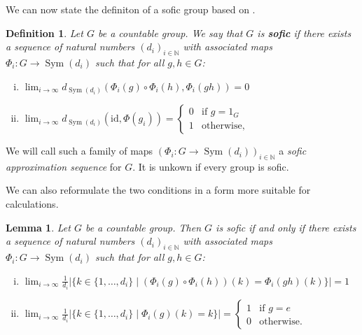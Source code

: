 \documentclass[titlepage, a4paper]{article}
\newcommand{\N}{\mathbb{N}}
\newcommand{\card}[1]{\left| #1 \right|}
\newcommand{\id}{\mathrm{id}}
\DeclareMathOperator{\sym}{Sym}
\newtheorem{definition}[theorem]{Definition}
\newtheorem{lemma}[theorem]{Lemma}
\theoremstyle{remark}
\begin{document}
We can now state the definiton of a sofic group based on \cite[section 1]{kerr_li_2010}.

\begin{definition}{}\label{def:Sofic}
        Let $G$ be a countable group. We say that $G$ is \textbf{sofic} if there exists a sequence of natural numbers $(d_i)_{i \in \N}$ with associated maps $\Phi_i : G \to \sym(d_i)$ such that for all $g, h \in G$:
        \begin{enumerate}[(i)]
            \item $ \displaystyle \lim_{i \to \infty} d_{\sym(d_i)}(\Phi_i(g) \circ \Phi_i(h), \Phi_i(gh)) = 0$
            \item $ \displaystyle \lim_{i \to \infty} d_{\sym(d_i)}(\id,\Phi(g_i)) = \begin{cases}  0 & \text{if } g = 1_G \\
                                                                                    1 & \text{otherwise,}
                                                                                    \end{cases}$
        \end{enumerate}
    \end{definition}

    We will call such a family of maps $\left(\Phi_i : G \to \sym(d_i) \right)_{i \in \N}$ 
    a \emph{sofic approximation sequence} for $G$. It is unkown if every group is sofic.

    We can also reformulate the two conditions in a form more suitable for calculations.
     \begin{lemma}
        Let $G$ be a countable group. Then $G$ is sofic if and only if there exists a sequence of natural numbers $(d_i)_{i \in \N}$ with associated maps $\Phi_i : G \to \sym(d_i)$ such that for all $g, h \in G$:
        \begin{enumerate}[(i)]
            \item $\displaystyle \lim_{i\to \infty} \frac{1}{d_i} \card{\big\{k \in \{1, \dots, d_i\} \mid (\Phi_i(g) \circ \Phi_i(h))(k) = \Phi_i(gh) (k) \big\}} = 1$
            \item $\displaystyle \lim_{i\to \infty} \frac{1}{d_i}  \card{\big\{k \in \{1, \dots, d_i\} \mid \Phi_i(g)(k) = k \big\}} = \begin{cases}  1 & \text{if } g = e \\
                                                                                    0 & \text{otherwise.}
                                                                                    \end{cases}$
        \end{enumerate}

    \end{lemma}
\end{document}
